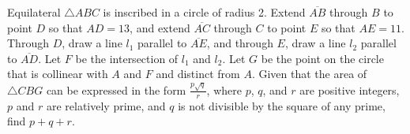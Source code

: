 Equilateral $\triangle ABC$ is inscribed in a circle of radius 2. Extend $\overline{AB}$ through $B$ to point $D$ so that $AD=13$, and extend $\overline{AC}$ through $C$ to point $E$ so that $AE=11$. Through $D$, draw a line $l_1$ parallel to $\overline{AE}$, and through $E$, draw a line ${l}_2$ parallel to $\overline{AD}$. Let $F$ be the intersection of ${l}_1$ and ${l}_2$. Let $G$ be the point on the circle that is collinear with $A$ and $F$ and distinct from $A$. Given that the area of $\triangle CBG$ can be expressed in the form $\frac{p\sqrt{q}}{r}$, where $p$, $q$, and $r$ are positive integers, $p$ and $r$ are relatively prime, and $q$ is not divisible by the square of any prime, find $p+q+r$.